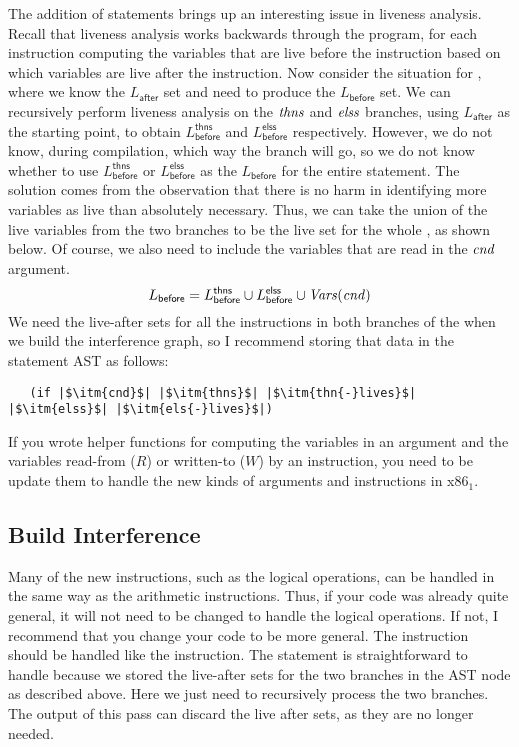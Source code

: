 \documentclass[11pt]{book}
\begin{document}
The addition of  statements brings up an interesting issue in
liveness analysis. Recall that liveness analysis works backwards
through the program, for each instruction computing the variables that
are live before the instruction based on which variables are live
after the instruction. Now consider the situation for , where we know the
$L_{\mathsf{after}}$ set and need to produce the $L_{\mathsf{before}}$
set.  We can recursively perform liveness analysis on the $\mathit{thns}$
and $\mathit{elss}$ branches, using $L_{\mathsf{after}}$ as the starting
point, to obtain $L^{\mathsf{thns}}_{\mathsf{before}}$ and
$L^{\mathsf{elss}}_{\mathsf{before}}$ respectively. However, we do not
know, during compilation, which way the branch will go, so we do not
know whether to use $L^{\mathsf{thns}}_{\mathsf{before}}$ or
$L^{\mathsf{elss}}_{\mathsf{before}}$ as the $L_{\mathsf{before}}$ for
the entire  statement. The solution comes from the observation
that there is no harm in identifying more variables as live than
absolutely necessary. Thus, we can take the union of the live
variables from the two branches to be the live set for the whole
, as shown below. Of course, we also need to include the
variables that are read in the $\mathit{cnd}$ argument.
\[
  L_{\mathsf{before}} = L^{\mathsf{thns}}_{\mathsf{before}} \cup 
  L^{\mathsf{elss}}_{\mathsf{before}} \cup \mathit{Vars}(\mathit{cnd})
\]
We need the live-after sets for all the instructions in both branches
of the  when we build the interference graph, so I recommend
storing that data in the  statement AST as follows:
\begin{lstlisting}
   (if |$\itm{cnd}$| |$\itm{thns}$| |$\itm{thn{-}lives}$| |$\itm{elss}$| |$\itm{els{-}lives}$|)
\end{lstlisting}

If you wrote helper functions for computing the variables in an
argument and the variables read-from ($R$) or written-to ($W$) by an
instruction, you need to be update them to handle the new kinds of
arguments and instructions in x86$_1$.

\subsection{Build Interference}
\label{sec:build-interference-r2}

Many of the new instructions, such as the logical operations, can be
handled in the same way as the arithmetic instructions. Thus, if your
code was already quite general, it will not need to be changed to
handle the logical operations. If not, I recommend that you change
your code to be more general. The  instruction should be
handled like the  instruction. The  statement is
straightforward to handle because we stored the live-after sets for the
two branches in the AST node as described above. Here we just need to
recursively process the two branches. The output of this pass can
discard the live after sets, as they are no longer needed.
\end{document}
